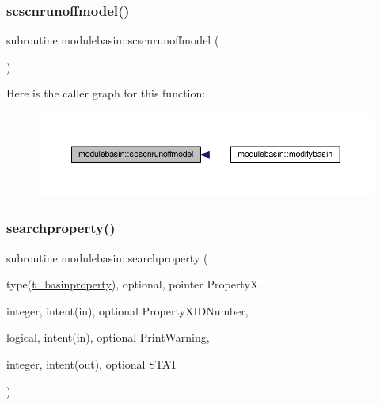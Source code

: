 \subsubsection{\texorpdfstring{scscnrunoffmodel()}{scscnrunoffmodel()}}
{\footnotesize\ttfamily subroutine modulebasin\+::scscnrunoffmodel (\begin{DoxyParamCaption}{ }\end{DoxyParamCaption})\hspace{0.3cm}{\ttfamily [private]}}

Here is the caller graph for this function\+:\nopagebreak
\begin{figure}[H]
\begin{center}
\leavevmode
\includegraphics[width=350pt]{namespacemodulebasin_aa0b9eaedf50e780116499db9c0c35730_icgraph}
\end{center}
\end{figure}
\mbox{\label{namespacemodulebasin_aa2e4e95b7bf5ee3e53a64d7f2269c946}} 
\subsubsection{\texorpdfstring{searchproperty()}{searchproperty()}}
{\footnotesize\ttfamily subroutine modulebasin\+::searchproperty (\begin{DoxyParamCaption}\item[{type(\mbox{\hyperlink{structmodulebasin_1_1t__basinproperty}{t\+\_\+basinproperty}}), optional, pointer}]{PropertyX,  }\item[{integer, intent(in), optional}]{Property\+X\+I\+D\+Number,  }\item[{logical, intent(in), optional}]{Print\+Warning,  }\item[{integer, intent(out), optional}]{S\+T\+AT }\end{DoxyParamCaption})\hspace{0.3cm}{\ttfamily [private]}}

